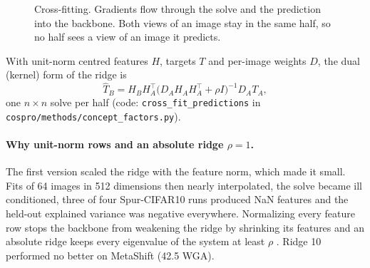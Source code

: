 \documentclass[11pt]{article}
\begin{document}
\begin{figure}[H]
\centering
{}
\caption{Cross-fitting. Gradients flow through the solve and the prediction into the backbone. Both views
of an image stay in the same half, so no half sees a view of an image it predicts.}
\label{fig:xfit}
\end{figure}

With unit-norm centred features $H$, targets $T$ and per-image weights $D$, the dual (kernel) form of the ridge
\citep{hoerl1970ridge,saunders1998dual} is
\begin{equation}
\hat T_B = H_B H_A^\top\big(D_A H_A H_A^\top+\rho I\big)^{-1} D_A T_A,
\end{equation}
one $n\times n$ solve per half (code: \texttt{cross\_fit\_predictions} in
\texttt{cospro/methods/concept\_factors.py}).

\paragraph{Why unit-norm rows and an absolute ridge $\rho=1$.} The first version scaled the ridge with the
feature norm, which made it small. Fits of 64 images in 512 dimensions then nearly interpolated, the solve became
ill conditioned, three of four Spur-CIFAR10 runs produced NaN features and the held-out explained variance was
negative everywhere. Normalizing every feature row stops the backbone from weakening the ridge by shrinking its
features and an absolute ridge keeps every eigenvalue of the system at least $\rho$ \citep{hoerl1970ridge}.
Ridge 10 performed no better on MetaShift (42.5 WGA).
\end{document}
